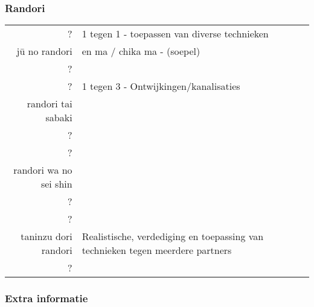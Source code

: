 \subsubsection{Randori}
\begin{table}[H]
\begin{center}
\begin{tabular}{rl}
    ? & 1 tegen 1 - toepassen van diverse technieken \\
    j\={u} no randori & en ma / chika ma - (soepel) \\
    ? & \\
    \hline
    ? & 1 tegen 3 - Ontwijkingen/kanalisaties \\
    randori tai sabaki & \\
    ? & \\
    \hline
    ? &  \\
    randori wa no sei shin & \\
    ? & \\
    \hline
    ? &  \\
    taninzu dori randori & Realistische, verdediging en toepassing van technieken tegen meerdere partners\\
    ? &
\end{tabular}
\end{center}
\label{randori_dan_2}
\end{table}


\subsubsection{Extra informatie}
